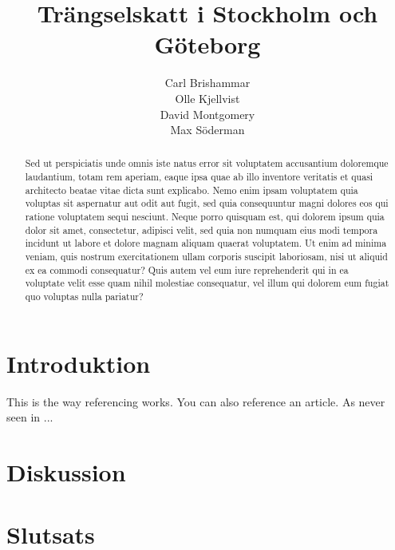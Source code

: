 \documentclass{amsart}
\title{Trängselskatt i Stockholm och Göteborg}
\author{Carl Brishammar \\ Olle Kjellvist \\ David Montgomery \\ Max Söderman}
\date{}
\begin{document}
\maketitle
\begin{abstract}
	Sed ut perspiciatis unde omnis iste natus error sit voluptatem accusantium doloremque laudantium, totam rem aperiam, eaque ipsa quae ab illo inventore veritatis et quasi architecto beatae vitae dicta sunt explicabo. Nemo enim ipsam voluptatem quia voluptas sit aspernatur aut odit aut fugit, sed quia consequuntur magni dolores eos qui ratione voluptatem sequi nesciunt. Neque porro quisquam est, qui dolorem ipsum quia dolor sit amet, consectetur, adipisci velit, sed quia non numquam eius modi tempora incidunt ut labore et dolore magnam aliquam quaerat voluptatem. Ut enim ad minima veniam, quis nostrum exercitationem ullam corporis suscipit laboriosam, nisi ut aliquid ex ea commodi consequatur? Quis autem vel eum iure reprehenderit qui in ea voluptate velit esse quam nihil molestiae consequatur, vel illum qui dolorem eum fugiat quo voluptas nulla pariatur?
\end{abstract}
\newpage
\tableofcontents
\newpage
\section{Introduktion}
This is the way referencing works. \parencite{book}
You can also reference an article. As never seen in \textcite{article}...

\section{Diskussion}

\section{Slutsats}

\newpage
\printbibliography
\end{document}
